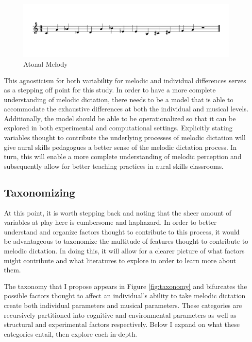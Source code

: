 \documentclass[]{book}
\begin{document}
\begin{figure}

{\centering \includegraphics[width=0.8\linewidth]{img/musicalexamples/MMD_Figure3-1} 

}

\caption{Atonal Melody}\label{fig:shortmelody2}
\end{figure}

This agnosticism for both variability for melodic and individual differences serves as a stepping off point for this study.
In order to have a more complete understanding of melodic dictation, there needs to be a model that is able to accommodate the exhaustive differences at both the individual and musical levels.
Additionally, the model should be able to be operationalized so that it can be explored in both experimental and computational settings.
Explicitly stating variables thought to contribute the underlying processes of melodic dictation will give aural skills pedagogues a better sense of the melodic dictation process.
In turn, this will enable a more complete understanding of melodic perception and subsequently allow for better teaching practices in aural skills classrooms.

\hypertarget{taxonomizing}{%
\subsection{Taxonomizing}\label{taxonomizing}}

At this point, it is worth stepping back and noting that the sheer amount of variables at play here is cumbersome and haphazard.
In order to better understand and organize factors thought to contribute to this process, it would be advantageous to taxonomize the multitude of features thought to contribute to melodic dictation.
In doing this, it will allow for a clearer picture of what factors might contribute and what literatures to explore in order to learn more about them.

The taxonomy that I propose appears in Figure \ref{fig:taxonomy} and bifurcates the possible factors thought to affect an individual's ability to take melodic dictation create both individual parameters and musical parameters.
These categories are recursively partitioned into cognitive and environmental parameters as well as structural and experimental factors respectively.
Below I expand on what these categories entail, then explore each in-depth.
\end{document}
